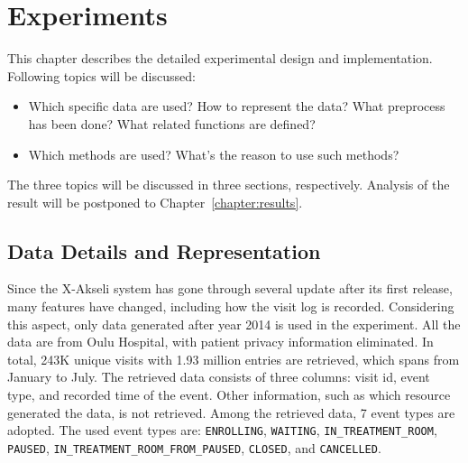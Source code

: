 \chapter{Experiments}
\label{chapter:Experiment}


	
This chapter describes the detailed experimental design and implementation. Following topics will be discussed:
\begin{itemize}
	\item	Which specific data are used? How to represent the data? What preprocess has been done? What related functions are defined?
	\item	Which methods are used? What's the reason to use such methods? 
\end{itemize}
The three topics will be discussed in three sections, respectively. Analysis of the result will be postponed to Chapter~\ref{chapter:results}.

\section{Data Details and Representation}
Since the X-Akseli system has gone through several update after its first release, many features have changed, including how the visit log is recorded. Considering this aspect, only data generated after year 2014 is used in the experiment. All the data are from Oulu Hospital, with patient privacy information eliminated. In total, 243K unique visits with 1.93 million entries are retrieved, which spans from January to July. The retrieved data consists of three columns: visit id, event type, and recorded time of the event. Other information, such as which resource generated the data, is not retrieved. Among the retrieved data, 7 event types are adopted. The used event types are: \texttt{ENROLLING}, \texttt{WAITING}, \texttt{IN\_TREATMENT\_ROOM}, \texttt{PAUSED}, \texttt{IN\_TREATMENT\_ROOM\_FROM\_PAUSED}, \texttt{CLOSED}, and \texttt{CANCELLED}.

